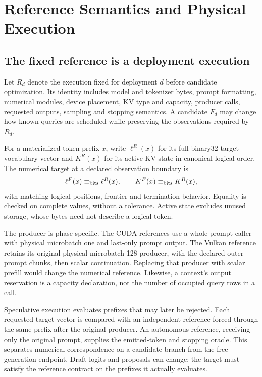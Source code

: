 \section{Reference Semantics and Physical Execution}
\label{sec:reference}
\subsection{The fixed reference is a deployment execution}
Let $R_d$ denote the execution fixed for deployment $d$ before candidate optimization. Its identity includes model and tokenizer bytes, prompt formatting, numerical modules, device placement, KV type and capacity, producer calls, requested outputs, sampling and stopping semantics. A candidate $F_d$ may change how known queries are scheduled while preserving the observations required by $R_d$.

For a materialized token prefix $x$, write $\ell^R(x)$ for its full binary32 target vocabulary vector and $K^R(x)$ for its active KV state in canonical logical order. The numerical target at a declared observation boundary is
\begin{equation}
 \ell^F(x)\mathrel{\equiv_{\mathrm{bits}}}\ell^R(x),\qquad K^F(x)\mathrel{\equiv_{\mathrm{bits}}} K^R(x),
 \label{eq:contract}
\end{equation}
with matching logical positions, frontier and termination behavior. Equality is checked on complete values, without a tolerance. Active state excludes unused storage, whose bytes need not describe a logical token. 

The producer is phase-specific. The CUDA references use a whole-prompt caller with physical microbatch one and last-only prompt output. The Vulkan reference retains its original physical microbatch 128 producer, with the declared outer prompt chunks, then scalar continuation. Replacing that producer with scalar prefill would change the numerical reference. Likewise, a context's output reservation is a capacity declaration, not the number of occupied query rows in a call.

Speculative execution evaluates prefixes that may later be rejected. Each requested target vector is compared with an independent reference forced through the same prefix after the original producer. An autonomous reference, receiving only the original prompt, supplies the emitted-token and stopping oracle. This separates numerical correspondence on a candidate branch from the free-generation endpoint. Draft logits and proposals can change; the target must satisfy the reference contract on the prefixes it actually evaluates.

